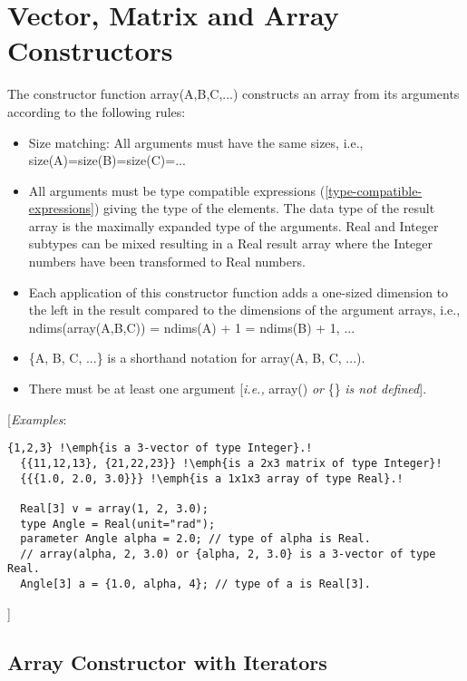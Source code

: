 \section{Vector, Matrix and Array Constructors}

The constructor function array(A,B,C,...) constructs an array from its
arguments according to the following rules:

\begin{itemize}
\item
  Size matching: All arguments must have the same sizes, i.e.,
  size(A)=size(B)=size(C)=...
\item
  All arguments must be type compatible expressions (\autoref{type-compatible-expressions}) giving
  the type of the elements. The data type of the result array is the
  maximally expanded type of the arguments. Real and Integer subtypes
  can be mixed resulting in a Real result array where the Integer
  numbers have been transformed to Real numbers.
\item
  Each application of this constructor function adds a one-sized
  dimension to the left in the result compared to the dimensions of the
  argument arrays, i.e., ndims(array(A,B,C)) = ndims(A) + 1 = ndims(B) +
  1, ...
\item
  \{A, B, C, ...\} is a shorthand notation for array(A, B, C, ...).
\item
  There must be at least one argument {[}\emph{i.e.,} array() \emph{or}
  \{\} \emph{is not defined}{]}.
\end{itemize}

{[}\emph{Examples}:
\begin{lstlisting}[language=modelica, escapechar=!]
  {1,2,3} !\emph{is a 3-vector of type Integer}.!
  {{11,12,13}, {21,22,23}} !\emph{is a 2x3 matrix of type Integer}!
  {{{1.0, 2.0, 3.0}}} !\emph{is a 1x1x3 array of type Real}.!

  Real[3] v = array(1, 2, 3.0);
  type Angle = Real(unit="rad");
  parameter Angle alpha = 2.0; // type of alpha is Real.
  // array(alpha, 2, 3.0) or {alpha, 2, 3.0} is a 3-vector of type Real.
  Angle[3] a = {1.0, alpha, 4}; // type of a is Real[3].
\end{lstlisting}
{]}

\subsection{Array Constructor with Iterators}

